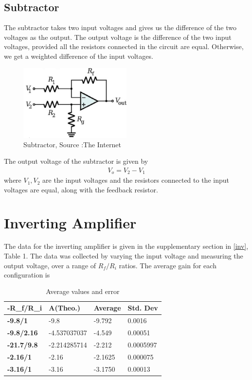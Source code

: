\documentclass{scrartcl}
\newcommand{\1}{\mathbbm{1}}
\begin{document}
\subsection{Subtractor}
The subtractor takes two input voltages and gives us the difference of the two voltages as the output. The output voltage is the difference of the two input voltages, provided all the resistors connected in the circuit are equal. Otherwise, we get a weighted difference of the input voltages.

\begin{figure}[H]
    \centering
    \includegraphics[width=0.5\textwidth]{sub.png}
    \caption{Subtractor, Source :The Internet}
\end{figure}

The output voltage of the subtractor is given by
\begin{align*}
    V_o = V_2 - V_1
\end{align*}
where $V_1, V_2$ are the input voltages and the resistors connected to the input voltages are equal, along with
the feedback resistor.

\section{Inverting Amplifier}
The data for the inverting amplifier is given in the supplementary section in \cref{inv}, Table 1. The data was collected by varying the input voltage and measuring the output voltage, over a range of 
$R_f/R_i$ ratios. The average gain for each configuration is
\begin{table}[H]
    \centering
    \caption{Average values and error}
    \begin{tabular}{|l|l|l|l|}
    \hline
        \textbf{-R\_f/R\_i} & \textbf{A(Theo.)} & \textbf{Average} & \textbf{Std. Dev} \\ \hline
        \textbf{-9.8/1} & -9.8 & -9.792 & 0.0016 \\ \hline
        \textbf{-9.8/2.16} & -4.537037037 & -4.549 & 0.00051 \\ \hline
        \textbf{-21.7/9.8} & -2.214285714 & -2.212 & 0.0005997 \\ \hline
        \textbf{-2.16/1} & -2.16 & -2.1625 & 0.000075 \\ \hline
        \textbf{-3.16/1} & -3.16 & -3.1750 & 0.00013 \\ \hline
    \end{tabular}
    \label{avg}
\end{table}
\end{document}
